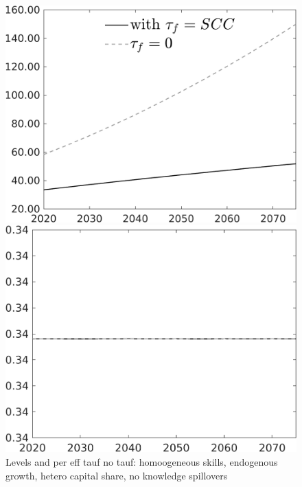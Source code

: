 \documentclass[12pt]{article}
\begin{document}
\begin{figure}[h!!]
	\centering
	\caption{Levels and per eff tauf no tauf: homoogeneous skills, endogenous growth, hetero capital share, no knowledge spillovers}\label{fig:Leveltauf_nsk1_xgr0_noknow_withtaul}
	\begin{minipage}[]{0.32\textwidth}
		\includegraphics[width=1\textwidth]{../../codding_model/own_basedOnFried/optimalPol_010922_revision/figures/all_13Sept22/LevTaufNoTauf_TaulCalib_regime0_Emnet_spillover0_nsk1_xgr0_knspil1_sep1_LFlimit0_emsbase0_countec0_GovRev0_etaa0.79_lgd1.png}
	\end{minipage}	
	\begin{minipage}[]{0.32\textwidth}
		\includegraphics[width=1\textwidth]{../../codding_model/own_basedOnFried/optimalPol_010922_revision/figures/all_13Sept22/LevTaufNoTauf_TaulCalib_regime0_hh_spillover0_nsk1_xgr0_knspil1_sep1_LFlimit0_emsbase0_countec0_GovRev0_etaa0.79_lgd0.png}

\end{minipage}
\end{figure}
\end{document}

